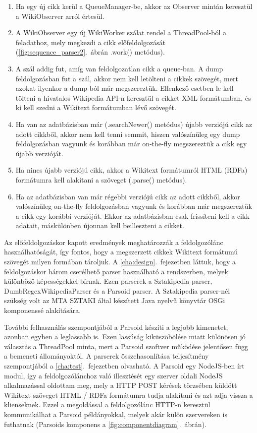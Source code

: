\begin{enumerate}
	\item Ha egy új cikk kerül a QueueManager-be, akkor az Observer mintán keresztül a WikiObserver arról értesül.
	\item A WikiObserver egy új WikiWorker szálat rendel a ThreadPool-ból a feladathoz, mely megkezdi a cikk előfeldolgozását (\ref{fig:sequence_parser2}.~ábrán .work() metódus).
	\item A szál addig fut, amíg van feldolgozatlan cikk a queue-ban. A dump feldolgozásban fut a szál, akkor nem kell letölteni a cikkek szövegét, mert azokat ilyenkor a dump-ból már megszereztük. Ellenkező esetben le kell tölteni a hivatalos Wikipedia API-n keresztül a cikket XML formátumban, és ki kell szedni a Wikitext formátumban lévő szövegét.
	\item Ha van az adatbázisban már (.searchNewer() metódus) újabb verziójú cikk az adott cikkből, akkor nem kell tenni semmit, hiszen valószínűleg egy dump feldolgozásban vagyunk és korábban már on-the-fly megszereztük a cikk egy újabb verzióját.
	\item Ha nincs újabb verziójú cikk, akkor a Wikitext formátumról HTML (RDFa) formátumra kell alakítani a szöveget (.parse() metódus).
	\item Ha az adatbázisban van már régebbi verziójú cikk az adott cikkből, akkor valószínűleg on-the-fly feldolgozásban vagyunk és korábban már megszereztük a cikk egy korábbi verzióját. Ekkor az adatbázisban csak frissíteni kell a cikk adatait, máskülönben újonnan kell beilleszteni a cikket.
\end{enumerate}

Az előfeldolgozáskor kapott eredmények meghatározzák a feldolgozólánc használhatóságát, így fontos, hogy a megszerzett cikkek Wikitext formátumú szövegét milyen formában tároljuk. A \ref{cha:design}.~fejezetben láttuk, hogy a feldolgozáskor három cserélhető parser használható a rendszerben, melyek különböző képességekkel bírnak. Ezen parserek a Sztakipedia parser, DumbRegexWikipediaParser és a Parsoid parser. A Sztakipedia parser-nél szükség volt az MTA SZTAKI által készített Java nyelvű könyvtár OSGi komponenssé alakítására.

További felhasználás szempontjából a Parsoid készíti a legjobb kimenetet, azonban egyben a leglassabb is. Ezen lassúság kiküszöbölése miatt különösen jó választás a ThreadPool minta, mert a Parsoid szoftver működése jelentősen függ a bemeneti állományoktól. A parserek összehasonlítása teljesítmény szempontjából a \ref{cha:test}.~fejezetben olvasható. A Parsoid egy NodeJS-ben írt modul, így a feldolgozólánchoz való illesztését egy szerver oldali NodeJS alkalmazással oldottam meg, mely a HTTP POST kérések törzsében küldött Wikitext szöveget HTML / RDFa formátumra tudja alakítani és azt adja vissza a klienseknek. Ezzel a megoldással a feldolgozólánc HTTP-n keresztül kommunikálhat a Parsoid példányokkal, melyek akár külön szervereken is futhatnak (Parsoids komponens a \ref{fig:componentdiagram}.~ábrán).

